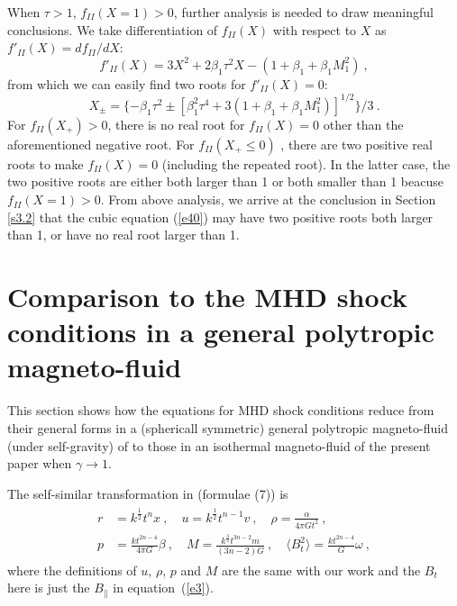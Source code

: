 \documentclass[fleqn,usenatbib]{mnras}
\begin{document}
When $\tau>1$, $f_{II}(X=1)>0$, further analysis is needed to draw meaningful conclusions. We take differentiation of $f_{II}(X)$ with respect to $X$ as $f'_{II}(X)=df_{II}/dX$:
\begin{equation}
f'_{II}(X)=3X^{2}+2\beta_{1}\tau^{2}X-\left(1+\beta_{1}+\beta_{1}M_{1}^{2}\right)\ ,
\end{equation}
from which we can easily find two roots for $f'_{II}(X)=0$:
\begin{equation}
X_{\pm}=\{ -\beta_{1}\tau^{2}\pm \left[ \beta_{1}^{2}\tau^{4}+3\left(1+\beta_{1}+\beta_{1}M_{1}^{2}\right)\right]^{1/2}\}/3\ .
\end{equation}
For $f_{II}(X_{+})>0$, there is no real root for $f_{II}(X)=0$ other than the aforementioned negative root. For $f_{II}(X_{+}\leq 0)$ 
, there are two positive real roots to make $f_{II}(X)=0$ (including the repeated root). In the latter case, the two positive roots are either both larger than 1 or both smaller than 1 beacuse $f_{II}(X=1)>0$. From above analysis, we arrive at the conclusion in Section \ref{s3.2} that the cubic equation (\ref{e40}) may have two positive roots both larger than 1, or have no real root larger than 1.


\section{Comparison to the MHD shock conditions in a general polytropic magneto-fluid}
\label{a5}
This section shows how the equations for MHD shock conditions reduce from their general forms in a (sphericall symmetric) general polytropic magneto-fluid (under self-gravity) of \citet{wang2008dynamic} to those in an isothermal magneto-fluid of the present paper when $\gamma\rightarrow 1$.

The self-similar transformation in \citet{wang2008dynamic} (formulae (7)) is
\begin{gather}
\begin{split}
r&=k^{\frac{1}{2}}t^{n}x\ ,\quad u=k^{\frac{1}{2}}t^{n-1}v\ ,\quad \rho=\frac{\alpha}{4\pi Gt^{2}}\ ,\\
p&=\frac{kt^{2n-4}}{4\pi G}\beta\ ,\quad M=\frac{k^{\frac{3}{2}}t^{3n-2}m}{(3n-2)G}\ ,\quad \langle B^{2}_{t}\rangle=\frac{kt^{2n-4}}{G}\omega\ ,
\end{split}\label{ee1}
\end{gather}
where the definitions of $u$, $\rho$, $p$ and $M$ are
the same with our work and the $B_{t}$ here is just the $B_{\parallel}$ in equation~(\ref{e3}). 
\end{document}

